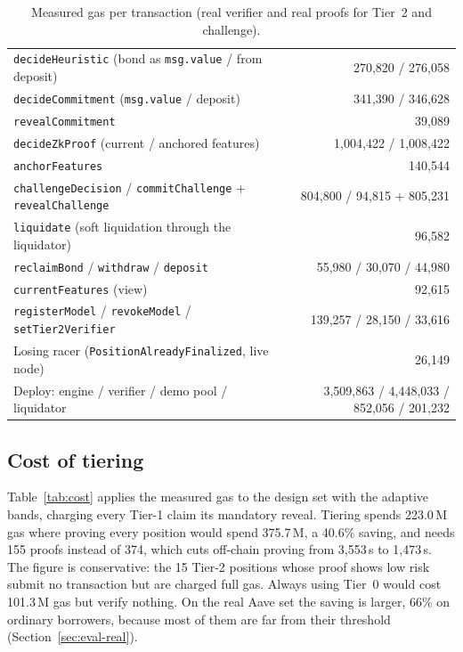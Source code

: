 \documentclass[sigconf,nonacm]{acmart}
\newcommand{\code}[1]{\texttt{\smaller #1}}
\begin{document}
\begin{table}[t]
  \caption{Measured gas per transaction (real verifier and real proofs for Tier~2 and challenge).}
  \label{tab:gas}
  \footnotesize
  \begin{tabularx}{\columnwidth}{@{}Lr@{}}
    \toprule
    \code{decideHeuristic} (bond as \code{msg.value} / from deposit) & 270,820 / 276,058 \\
    \code{decideCommitment} (\code{msg.value} / deposit) & 341,390 / 346,628 \\
    \code{revealCommitment} & 39,089 \\
    \code{decideZkProof} (current / anchored features) & 1,004,422 / 1,008,422 \\
    \code{anchorFeatures} & 140,544 \\
    \code{challengeDecision} / \code{commitChallenge} + \code{revealChallenge} & 804,800 / 94,815 + 805,231 \\
    \code{liquidate} (soft liquidation through the liquidator) & 96,582 \\
    \code{reclaimBond} / \code{withdraw} / \code{deposit} & 55,980 / 30,070 / 44,980 \\
    \code{currentFeatures} (view) & 92,615 \\
    \code{registerModel} / \code{revokeModel} / \code{setTier2Verifier} & 139,257 / 28,150 / 33,616 \\
    Losing racer (\code{PositionAlreadyFinalized}, live node) & 26,149 \\
    Deploy: engine / verifier / demo pool / liquidator & 3,509,863 / 4,448,033 / 852,056 / 201,232 \\
    \bottomrule
  \end{tabularx}
\end{table}

\subsection{Cost of tiering}

Table~\ref{tab:cost} applies the measured gas to the design set with the adaptive bands, charging every Tier-1 claim its mandatory reveal. Tiering spends 223.0\,M gas where proving every position would spend 375.7\,M, a 40.6\% saving, and needs 155 proofs instead of 374, which cuts off-chain proving from 3,553\,s to 1,473\,s. The figure is conservative: the 15 Tier-2 positions whose proof shows low risk submit no transaction but are charged full gas. Always using Tier~0 would cost 101.3\,M gas but verify nothing. On the real Aave set the saving is larger, 66\% on ordinary borrowers, because most of them are far from their threshold (Section~\ref{sec:eval-real}).
\end{document}
